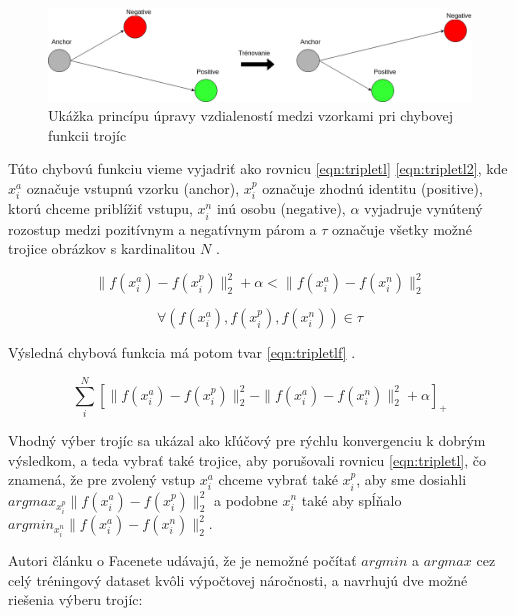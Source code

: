 \begin{figure}[H]
	\centering
	\includegraphics[width=0.75\linewidth]{img/triplet}
	\caption{Ukážka princípu úpravy vzdialeností medzi vzorkami pri chybovej funkcii trojíc}
	\label{fig:triplet}
\end{figure}

Túto chybovú funkciu vieme vyjadriť ako rovnicu \eqref{eqn:tripletl} \eqref{eqn:tripletl2}, kde $x_{i}^a$ označuje vstupnú vzorku (anchor), $x_{i}^p$ označuje zhodnú identitu (positive), ktorú chceme priblížiť vstupu,
$x_{i}^n$ inú osobu (negative), $\alpha$ vyjadruje vynútený rozostup medzi pozitívnym a negatívnym párom a $\tau$ označuje všetky možné trojice obrázkov s kardinalitou $ N $ \cite{schroff2015facenet}.

\begin{equation}\label{eqn:tripletl}
\parallel f(x_{i}^a) - f(x_{i}^p) \parallel_{2}^2 + \alpha <
\parallel f(x_{i}^a) - f(x_{i}^n)\parallel_{2}^2
\end{equation}

\begin{equation}\label{eqn:tripletl2}
\forall (f(x_{i}^a), f(x_{i}^p), f(x_{i}^n)) \in \tau
\end{equation}

\indent Výsledná chybová funkcia má potom tvar \eqref{eqn:tripletlf} \cite{schroff2015facenet}.

\begin{equation}\label{eqn:tripletlf}
\sum \limits_{i}^N [
\parallel f(x_{i}^a) - f(x_{i}^p) \parallel_{2}^2 -
\parallel f(x_{i}^a) - f(x_{i}^n) \parallel_{2}^2 + \alpha 
]_{+}
\end{equation} 

\indent Vhodný výber trojíc sa ukázal ako kľúčový pre rýchlu konvergenciu k dobrým výsledkom, a teda
vybrať také trojice, aby porušovali rovnicu \eqref{eqn:tripletl}, čo znamená, že pre zvolený vstup
$x_{i}^a$ chceme vybrať také $x_{i}^p$, aby sme dosiahli $argmax_{x_{i}^p}\parallel f(x_{i}^a) - f(x_{i}^p) \parallel_{2}^2$ a podobne $x_{i}^n$ také aby spĺňalo $argmin_{x_{i}^n}\parallel f(x_{i}^a) - f(x_{i}^n) \parallel_{2}^2$. 

Autori článku\cite{schroff2015facenet} o Facenete udávajú, že je nemožné počítať $ argmin $ a $ argmax $ cez celý tréningový dataset kvôli výpočtovej náročnosti, a navrhujú dve možné riešenia výberu trojíc:

